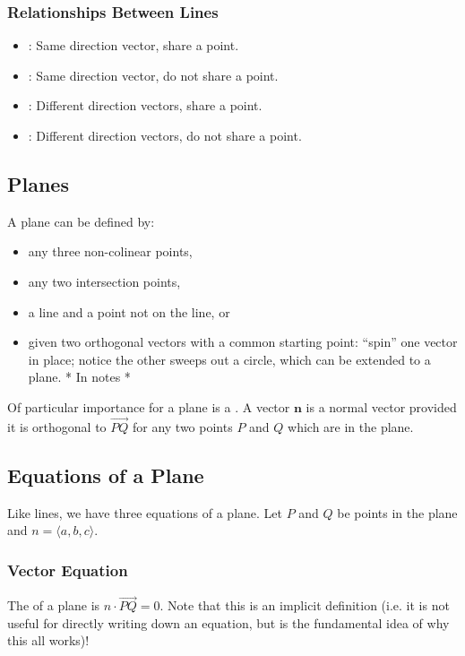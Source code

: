 \subsubsection{Relationships Between Lines}

\begin{itemize}
    \item {}: Same direction vector, share a point.
    \item {}: Same direction vector, do not share a point.
    \item {}: Different direction vectors, share a point.
    \item {}: Different direction vectors, do not share a point.
\end{itemize}

\subsection{Planes}
A plane can be defined by:
\begin{itemize}
    \item any three non-colinear points,
    \item any two intersection points,
    \item a line and a point not on the line, or
    \item given two orthogonal vectors with a common starting point: ``spin''  one vector in place; notice the other sweeps out a circle, which can be extended to a plane. * In notes *
\end{itemize}
Of particular importance for a plane is a . A vector \(\mathbf{n}\) is a normal vector provided it is orthogonal to \(\overrightarrow{PQ}\) for any two points \(P\) and \(Q\) which are in the plane.

\subsection{Equations of a Plane}

Like lines, we have three equations of a plane. Let \(P\) and \(Q\) be points in the plane and \(n = \langle a,b,c \rangle\).

\subsubsection{Vector Equation}

The  of a plane is \(n \cdot \overrightarrow{PQ} = 0\). Note that this is an implicit definition (i.e. it is not useful for directly writing down an equation, but is the fundamental idea of why this all works)!

